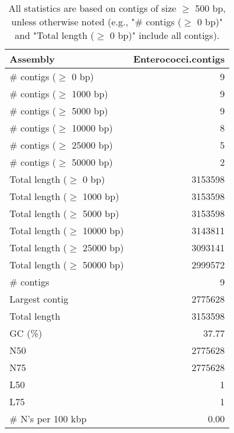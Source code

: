\documentclass[12pt,a4paper]{article}
\begin{document}
\begin{table}[ht]
\begin{center}
\caption{All statistics are based on contigs of size $\geq$ 500 bp, unless otherwise noted (e.g., "\# contigs ($\geq$ 0 bp)" and "Total length ($\geq$ 0 bp)" include all contigs).}
\begin{tabular}{|l*{1}{|r}|}
\hline
Assembly & Enterococci.contigs \\ \hline
\# contigs ($\geq$ 0 bp) & 9 \\ \hline
\# contigs ($\geq$ 1000 bp) & 9 \\ \hline
\# contigs ($\geq$ 5000 bp) & 9 \\ \hline
\# contigs ($\geq$ 10000 bp) & 8 \\ \hline
\# contigs ($\geq$ 25000 bp) & 5 \\ \hline
\# contigs ($\geq$ 50000 bp) & 2 \\ \hline
Total length ($\geq$ 0 bp) & 3153598 \\ \hline
Total length ($\geq$ 1000 bp) & 3153598 \\ \hline
Total length ($\geq$ 5000 bp) & 3153598 \\ \hline
Total length ($\geq$ 10000 bp) & 3143811 \\ \hline
Total length ($\geq$ 25000 bp) & 3093141 \\ \hline
Total length ($\geq$ 50000 bp) & 2999572 \\ \hline
\# contigs & 9 \\ \hline
Largest contig & 2775628 \\ \hline
Total length & 3153598 \\ \hline
GC (\%) & 37.77 \\ \hline
N50 & 2775628 \\ \hline
N75 & 2775628 \\ \hline
L50 & 1 \\ \hline
L75 & 1 \\ \hline
\# N's per 100 kbp & 0.00 \\ \hline
\end{tabular}
\end{center}
\end{table}
\end{document}
